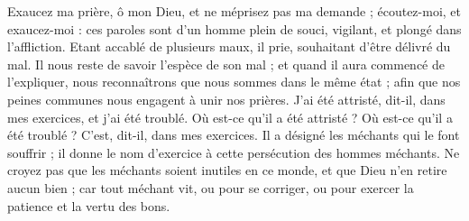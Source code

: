 Exaucez ma prière, ô mon Dieu, et ne méprisez pas ma demande ; écoutez-moi, et exaucez-moi : ces paroles sont d’un homme plein de souci, vigilant, et plongé dans l’affliction. Etant accablé de plusieurs maux, il prie, souhaitant d’être délivré du mal.
Il nous reste de savoir l’espèce de son mal ; et quand il aura commencé de l’expliquer, nous reconnaîtrons que nous sommes dans le même état ; afin que nos peines communes nous engagent à unir nos prières. J’ai été attristé, dit-il, dans mes exercices, et j’ai été troublé. Où est-ce qu’il a été attristé ? Où est-ce qu’il a été troublé ?
C’est, dit-il, dans mes exercices. Il a désigné les méchants qui le font souffrir ; il donne le nom d’exercice à cette persécution des hommes méchants. Ne croyez pas que les méchants soient inutiles en ce monde, et que Dieu n’en retire aucun bien ; car tout méchant vit, ou pour se corriger, ou pour exercer la patience et la vertu des bons.